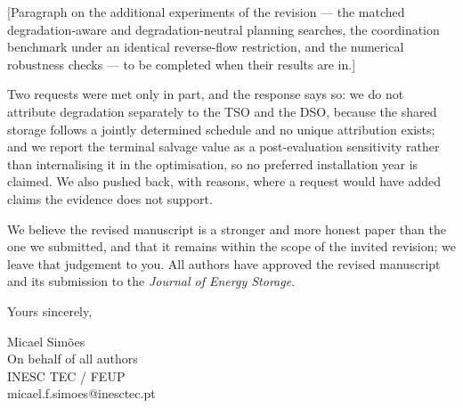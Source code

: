 \documentclass[12pt]{letter}
\begin{document}
\begin{letter}{}
    [Paragraph on the additional experiments of the revision --- the matched degradation-aware and degradation-neutral planning searches, the coordination benchmark under an identical reverse-flow restriction, and the numerical robustness checks --- to be completed when their results are in.]

    Two requests were met only in part, and the response says so: we do not attribute degradation separately to the TSO and the DSO, because the shared storage follows a jointly determined schedule and no unique attribution exists; and we report the terminal salvage value as a post-evaluation sensitivity rather than internalising it in the optimisation, so no preferred installation year is claimed. We also pushed back, with reasons, where a request would have added claims the evidence does not support.

    We believe the revised manuscript is a stronger and more honest paper than the one we submitted, and that it remains within the scope of the invited revision; we leave that judgement to you. All authors have approved the revised manuscript and its submission to the \textit{Journal of Energy Storage}.

    \closing{Yours sincerely,}
    Micael Simões\\
    On behalf of all authors\\
    INESC TEC / FEUP\\
    micael.f.simoes@inesctec.pt

\end{letter}
\end{document}
